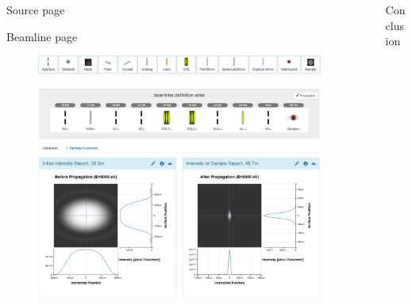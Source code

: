 \documentclass[final]{beamer}
\newlength{\sepwid}
\newlength{\onecolwid}
\newlength{\twocolwid}
\begin{document}
\begin{frame}[t]
\begin{columns}[t]
\begin{column}{\twocolwid}
\begin{block}{\faLightbulbO{} Source page}
\end{block} 


\begin{block}{\faSignOut{} \faEllipsisH{} \faBullseye{} Beamline page}

\begin{figure}
\includegraphics[width=0.85\linewidth]{images/toolbar_menu.png}
\end{figure}

\begin{figure}
\includegraphics[width=0.85\linewidth]{images/beamline_page.png}
\end{figure}

\end{block}



\end{column} %

\begin{column}{\sepwid}\end{column} %

\begin{column}{\onecolwid} %


\begin{block}{\faFlag{} Conclusion}


\end{block}
\end{column}
\end{columns}
\end{frame}
\end{document}
